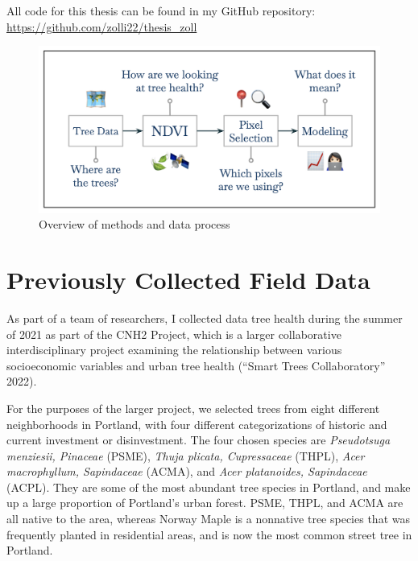 \documentclass[12pt,twoside]{reedthesis}
\begin{document}
All code for this thesis can be found in my GitHub repository:
\url{https://github.com/zolli22/thesis_zoll}
\begin{figure}[H]

{\centering \includegraphics[width=0.95\linewidth,]{figure/methods-overview} 

}

\caption{Overview of methods and data process}\label{fig:methods-overview-fig}
\end{figure}
\hypertarget{previously-collected-field-data}{%
\section{Previously Collected Field Data}\label{previously-collected-field-data}}

As part of a team of researchers, I collected data tree health during
the summer of 2021 as part of the CNH2 Project, which is a larger
collaborative interdisciplinary project examining the relationship
between various socioeconomic variables and urban tree health
({``Smart Trees Collaboratory''} 2022).

For the purposes of the larger project, we selected trees from eight
different neighborhoods in Portland, with four different categorizations
of historic and current investment or disinvestment. The four chosen
species are \emph{Pseudotsuga menziesii, Pinaceae} (PSME), \emph{Thuja plicata,
Cupressaceae} (THPL), \emph{Acer macrophyllum, Sapindaceae} (ACMA), and \emph{Acer
platanoides, Sapindaceae} (ACPL). They are some of the most abundant
tree species in Portland, and make up a large proportion of Portland's
urban forest. PSME, THPL, and ACMA are all native to the area, whereas
Norway Maple is a nonnative tree species that was frequently planted in
residential areas, and is now the most common street tree in Portland.
\end{document}
